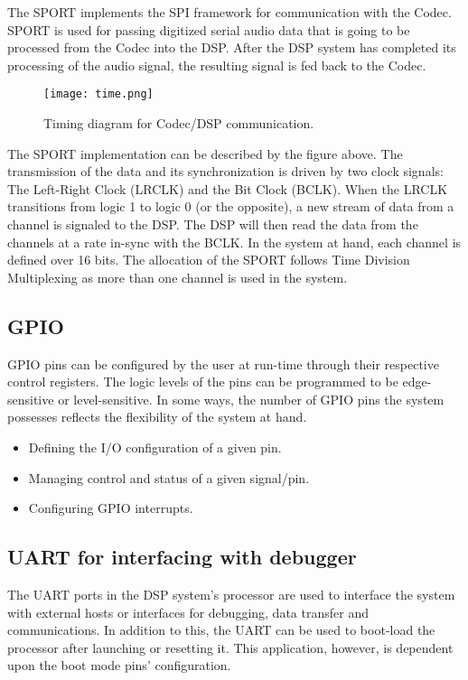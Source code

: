 The SPORT implements the SPI framework for communication with the Codec. SPORT is used for passing digitized serial audio data that is going to be processed from the Codec into the DSP. After the DSP system has completed its processing of the audio signal, the resulting signal is fed back to the Codec. 


\begin{figure}[h!]
	\centering
	\texttt{[image: time.png]}
	\caption{Timing diagram for Codec/DSP communication.}
	\label{fig:timing}
	
\end{figure}

The SPORT implementation can be described by the figure above. The transmission of the data and its synchronization is driven by two clock signals: The Left-Right Clock (LRCLK) and the Bit Clock (BCLK). When the LRCLK transitions from logic 1 to logic 0 (or the opposite), a new stream of data from a channel is signaled to the DSP. The DSP will then read the data from the channels at a rate in-sync with the BCLK. In the system at hand, each channel is defined over 16 bits. The allocation of the SPORT follows Time Division Multiplexing as more than one channel is used in the system. 


\subsection{GPIO}
GPIO pins can be configured by the user at run-time through their respective control registers. The logic levels of the pins can be programmed to be edge-sensitive or level-sensitive. In some ways, the number of GPIO pins the system possesses reflects the flexibility of the system at hand. 


\begin{itemize}
	\setlength\itemsep{0.1em}
	\item Defining the I/O configuration of a given pin. 
	\item Managing control and status of a given signal/pin. 
	\item Configuring GPIO interrupts. 
\end{itemize}




\subsection{UART for interfacing with debugger}

The UART ports in the DSP system’s processor are used to interface the system with external hosts or interfaces for debugging, data transfer and communications. In addition to this, the UART can be used to boot-load the processor after launching or resetting it. This application, however, is dependent upon the boot mode pins’ configuration. 

